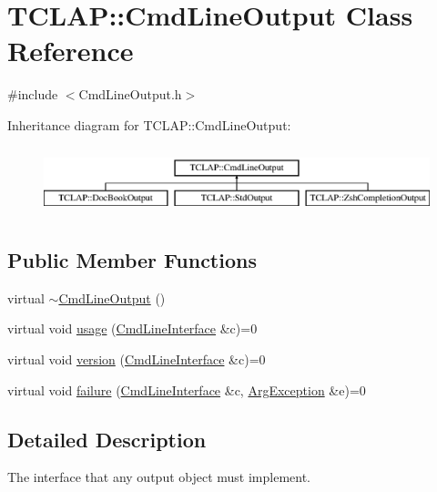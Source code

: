 \hypertarget{class_t_c_l_a_p_1_1_cmd_line_output}{}\section{T\+C\+L\+A\+P\+:\+:Cmd\+Line\+Output Class Reference}
\label{class_t_c_l_a_p_1_1_cmd_line_output}


{\ttfamily \#include $<$Cmd\+Line\+Output.\+h$>$}

Inheritance diagram for T\+C\+L\+A\+P\+:\+:Cmd\+Line\+Output\+:\begin{figure}[H]
\begin{center}
\leavevmode
\includegraphics[height=1.996435cm]{class_t_c_l_a_p_1_1_cmd_line_output}
\end{center}
\end{figure}
\subsection*{Public Member Functions}
\begin{DoxyCompactItemize}
\item 
virtual \hyperlink{class_t_c_l_a_p_1_1_cmd_line_output_afdf4435a2619076d9798a0a950ed405b}{$\sim$\+Cmd\+Line\+Output} ()
\item 
virtual void \hyperlink{class_t_c_l_a_p_1_1_cmd_line_output_a685b13db5bf6bbe5159e49169cd96bbe}{usage} (\hyperlink{class_t_c_l_a_p_1_1_cmd_line_interface}{Cmd\+Line\+Interface} \&c)=0
\item 
virtual void \hyperlink{class_t_c_l_a_p_1_1_cmd_line_output_ae052fea473132482296de55edb3dd480}{version} (\hyperlink{class_t_c_l_a_p_1_1_cmd_line_interface}{Cmd\+Line\+Interface} \&c)=0
\item 
virtual void \hyperlink{class_t_c_l_a_p_1_1_cmd_line_output_ad23a57ac3d8d957a4328fc78aec94e16}{failure} (\hyperlink{class_t_c_l_a_p_1_1_cmd_line_interface}{Cmd\+Line\+Interface} \&c, \hyperlink{class_t_c_l_a_p_1_1_arg_exception}{Arg\+Exception} \&e)=0
\end{DoxyCompactItemize}


\subsection{Detailed Description}
The interface that any output object must implement. 

